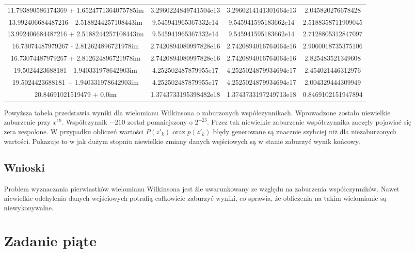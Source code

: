 \documentclass[a4paper]{article}
\begin{document}
\begin{table}[ht]
\begin{adjustbox}{width=1\textwidth}
\begin{tabular}{ |c | c | c | c|  }
11.793890586174369 + 1.6524771364075785im & 3.2960224849741504e13 & 3.2960214141301664e13 & 2.045820276678428 \\
13.992406684487216 - 2.5188244257108443im & 9.545941965367332e14 & 9.545941595183662e14 & 2.5188358711909045 \\
13.992406684487216 + 2.5188244257108443im & 9.545941965367332e14 & 9.545941595183662e14 & 2.7128805312847097 \\
16.73074487979267 - 2.812624896721978im & 2.7420894080997828e16 & 2.7420894016764064e16 & 2.9060018735375106 \\
16.73074487979267 + 2.812624896721978im & 2.7420894080997828e16 & 2.7420894016764064e16 & 2.825483521349608 \\
19.5024423688181 - 1.940331978642903im & 4.252502487879955e17 & 4.2525024879934694e17 & 2.454021446312976 \\
19.5024423688181 + 1.940331978642903im & 4.252502487879955e17 & 4.2525024879934694e17 & 2.004329444309949 \\
20.84691021519479 + 0.0im & 1.3743733195398482e18 & 1.3743733197249713e18 & 0.8469102151947894 \\
 \hline
\end{tabular}
\end{adjustbox}
\end{table}

Powyższa tabela przedstawia wyniki dla wielomianu Wilkinsona o zaburzonych współczynnikach. Wprowadzone zostało niewielkie zaburzenie przy $x^{19}$. Współczynnik $-210$ został pomniejszony o $2^{-23}$. Przez tak niewielkie zaburzenie współczynnika zaczęły pojawiać się zera zespolone. W przypadku obliczeń wartości $P(z'_{k})$ oraz $p(z'_{k})$ błędy generowane są znacznie szybciej niż dla niezaburzonych wartości. Pokazuje to w jak dużym stopniu niewielkie zmiany danych wejściowych są w stanie zaburzyć wynik końcowy. 
\subsection{Wnioski}
\paragraph{}
Problem wyznaczania pierwiastków wielomianu Wilkinsona jest źle uwarunkowany ze względu na zaburzenia współczynników. Nawet niewielkie odchylenia danych wejściowych potrafią całkowicie zaburzyć wyniki, co sprawia, że obliczenia na takim wielomianie są niewykonywalne.
\section{Zadanie piąte}
\end{document}
